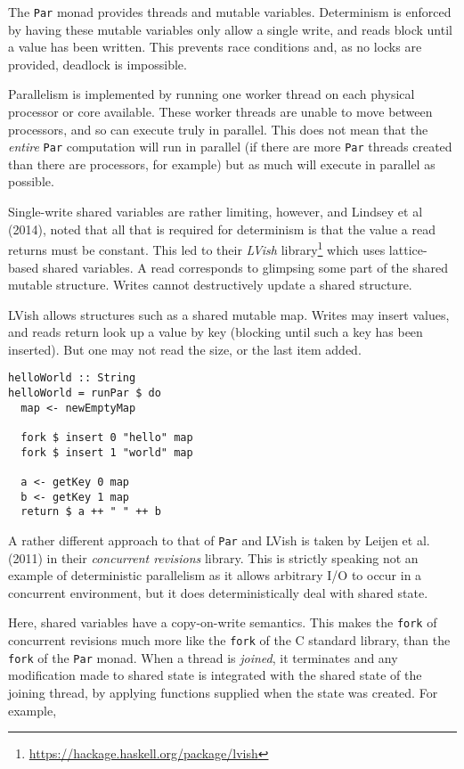The \verb|Par| monad provides threads and mutable
variables. Determinism is enforced by having these mutable variables
only allow a single write, and reads block until a value has been
written. This prevents race conditions and, as no locks are provided,
deadlock is impossible.

Parallelism is implemented by running one worker thread on each
physical processor or core available. These worker threads are unable
to move between processors, and so can execute truly in parallel. This
does not mean that the \textit{entire} \verb|Par| computation will run
in parallel (if there are more \verb|Par| threads created than there
are processors, for example) but as much will execute in parallel as
possible.

Single-write shared variables are rather limiting, however, and
Lindsey et al (2014)\nocite{lvish}, noted that all that is required
for determinism is that the value a read returns must be
constant. This led to their \textit{LVish}
library\footnote{\url{https://hackage.haskell.org/package/lvish}}
which uses lattice-based shared variables. A read corresponds to
glimpsing some part of the shared mutable structure. Writes cannot
destructively update a shared structure.

LVish allows structures such as a shared mutable map. Writes may
insert values, and reads return look up a value by key (blocking until
such a key has been inserted). But one may not read the size, or the
last item added.

\begin{verbatim}
helloWorld :: String
helloWorld = runPar $ do
  map <- newEmptyMap

  fork $ insert 0 "hello" map
  fork $ insert 1 "world" map

  a <- getKey 0 map
  b <- getKey 1 map
  return $ a ++ " " ++ b
\end{verbatim}

A rather different approach to that of \verb|Par| and LVish is taken
by Leijen et al. (2011)\nocite{revisions} in their \textit{concurrent
  revisions} library. This is strictly speaking not an example of
deterministic parallelism as it allows arbitrary I/O to occur in a
concurrent environment, but it does deterministically deal with shared
state.

Here, shared variables have a copy-on-write semantics. This makes the
\verb|fork| of concurrent revisions much more like the \verb|fork| of
the C standard library, than the \verb|fork| of the \verb|Par|
monad. When a thread is \textit{joined}, it terminates and any
modification made to shared state is integrated with the shared state
of the joining thread, by applying functions supplied when the state
was created. For example,


